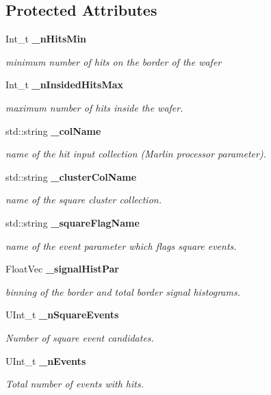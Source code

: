 \subsection*{Protected Attributes}
\begin{DoxyCompactItemize}
\item 
Int\-\_\-t {\bf \-\_\-n\-Hits\-Min}\label{classCALICE_1_1SquareFinder_a2c9c17a9f50875e1762b5c2347209d3c}

\begin{DoxyCompactList}\small\item\em minimum number of hits on the border of the wafer \end{DoxyCompactList}\item 
Int\-\_\-t {\bf \-\_\-n\-Insided\-Hits\-Max}
\begin{DoxyCompactList}\small\item\em maximum number of hits inside the wafer. \end{DoxyCompactList}\item 
std\-::string {\bf \-\_\-col\-Name}
\begin{DoxyCompactList}\small\item\em name of the hit input collection (Marlin processor parameter). \end{DoxyCompactList}\item 
std\-::string {\bf \-\_\-cluster\-Col\-Name}
\begin{DoxyCompactList}\small\item\em name of the square cluster collection. \end{DoxyCompactList}\item 
std\-::string {\bf \-\_\-square\-Flag\-Name}
\begin{DoxyCompactList}\small\item\em name of the event parameter which flags square events. \end{DoxyCompactList}\item 
Float\-Vec {\bf \-\_\-signal\-Hist\-Par}
\begin{DoxyCompactList}\small\item\em binning of the border and total border signal histograms. \end{DoxyCompactList}\item 
U\-Int\-\_\-t {\bf \-\_\-n\-Square\-Events}
\begin{DoxyCompactList}\small\item\em Number of square event candidates. \end{DoxyCompactList}\item 
U\-Int\-\_\-t {\bf \-\_\-n\-Events}
\begin{DoxyCompactList}\small\item\em Total number of events with hits. \end{DoxyCompactList}\end{DoxyCompactItemize}
